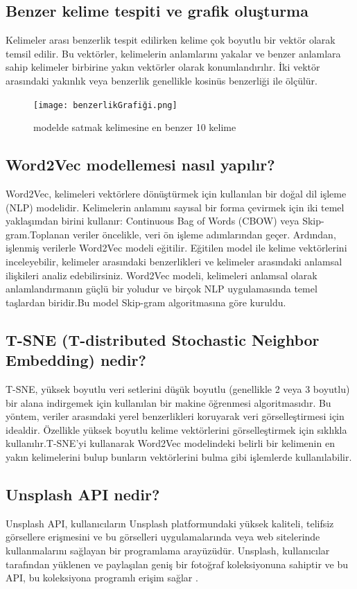 \documentclass[12pt, a4paper]{article}
\begin{document}
	\subsection{Benzer kelime tespiti ve grafik oluşturma}
	Kelimeler arası benzerlik tespit edilirken kelime çok boyutlu bir vektör olarak temsil edilir. Bu vektörler, kelimelerin anlamlarını yakalar ve benzer anlamlara sahip kelimeler birbirine yakın vektörler olarak konumlandırılır. İki vektör arasındaki yakınlık veya benzerlik genellikle kosinüs benzerliği ile ölçülür.
	
	\begin{figure}[h]
		\centering
		\texttt{[image: benzerlikGrafiği.png]}
		\caption{modelde satmak kelimesine en benzer 10 kelime}
		\label{bulut2}
	\end{figure}
	\newpage
	
	
	\subsection{Word2Vec modellemesi nasıl yapılır?}
	Word2Vec, kelimeleri vektörlere dönüştürmek için kullanılan bir doğal dil işleme (NLP) modelidir. Kelimelerin anlamını sayısal bir forma çevirmek için iki temel yaklaşımdan birini kullanır: Continuous Bag of Words (CBOW) veya Skip-gram.Toplanan veriler öncelikle, veri ön işleme adımlarından geçer. Ardından, işlenmiş verilerle Word2Vec modeli eğitilir. Eğitilen model ile kelime vektörlerini inceleyebilir, kelimeler arasındaki benzerlikleri ve kelimeler arasındaki anlamsal ilişkileri analiz edebilirsiniz. Word2Vec modeli, kelimeleri anlamsal olarak anlamlandırmanın güçlü bir yoludur ve birçok NLP uygulamasında temel taşlardan biridir.Bu model Skip-gram algoritmasına göre kuruldu.
	
	
	\subsection{T-SNE (T-distributed Stochastic Neighbor Embedding) nedir?}
	T-SNE, yüksek boyutlu veri setlerini düşük boyutlu (genellikle 2 veya 3 boyutlu) bir alana indirgemek için kullanılan bir makine öğrenmesi algoritmasıdır. Bu yöntem, veriler arasındaki yerel benzerlikleri koruyarak veri görselleştirmesi için idealdir. Özellikle yüksek boyutlu kelime vektörlerini görselleştirmek için sıklıkla kullanılır.T-SNE'yi kullanarak Word2Vec modelindeki belirli bir kelimenin en yakın kelimelerini bulup bunların vektörlerini bulma gibi işlemlerde kullanılabilir.
	
	\subsection{Unsplash API nedir?}
	Unsplash API, kullanıcıların Unsplash platformundaki yüksek kaliteli, telifsiz görsellere erişmesini ve bu görselleri uygulamalarında veya web sitelerinde kullanmalarını sağlayan bir programlama arayüzüdür. Unsplash, kullanıcılar tarafından yüklenen ve paylaşılan geniş bir fotoğraf koleksiyonuna sahiptir ve bu API, bu koleksiyona programlı erişim sağlar \cite{unsplash}.
	\newpage
\end{document}
